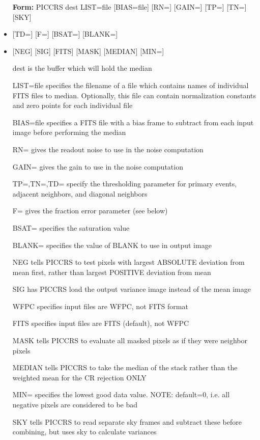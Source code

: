 \begin{itemize}
  \item[\textbf{Form: }PICCRS dest LIST=file {[BIAS=file]} {[RN=]} {[GAIN=]} 
       {[TP=]} {[TN=]} {[SKY]}\hfill]{}
  \item{{[TD=]} {[F=]} {[BSAT=]} {[BLANK=]} }
  \item{{[NEG]} {[SIG]} {[FITS]} {[MASK]} {[MEDIAN]} {[MIN=]}}
  \item[dest]{is the buffer which will hold the median}
  \item[LIST=file]{specifies the filename of a file which contains
       names of individual FITS files to median. Optionally,
       this file can contain normalization constants and
       zero points for each individual file}
  \item[BIAS=file]{specifies a FITS file with a bias frame to subtract
       from each input image before performing the median}
  \item[RN=]{gives the readout noise to use in the noise computation}
  \item[GAIN=]{gives the gain to use in the noise computation}
  \item[TP=,TN=,TD=]{specify the thresholding parameter for primary events,
                        adjacent neighbors, and diagonal neighbors}
  \item[F=]{gives the fraction error parameter (see below) }
  \item[BSAT=]{specifies the saturation value}
  \item[BLANK=]{specifies the value of BLANK to use in output image}
  \item[NEG]{tells PICCRS to test pixels with largest ABSOLUTE
       deviation from mean first, rather than largest
       POSITIVE deviation from mean}
  \item[SIG]{has PICCRS load the output variance image instead of 
       the mean image}
  \item[WFPC]{specifies input files are WFPC, not FITS format}
  \item[FITS]{specifies input files are FITS (default), not WFPC }
  \item[MASK]{tells PICCRS to evaluate all masked pixels as if
                        they were neighbor pixels}
  \item[MEDIAN]{tells PICCRS to take the median of the stack rather
                        than the weighted mean for the CR rejection ONLY}
  \item[MIN=]{specifies the lowest good data value. NOTE: default=0,
                        i.e. all negative pixels are considered to be bad}
  \item[SKY]{tells PICCRS to read separate sky frames and subtract these
            before combining, but uses sky to calculate variances}
\end{itemize}

